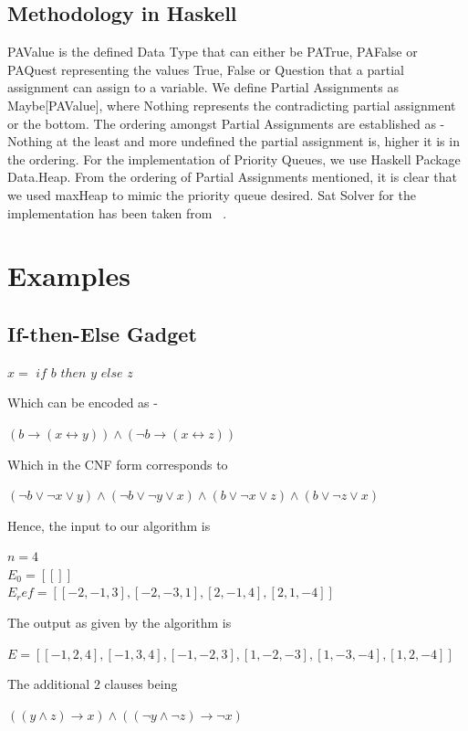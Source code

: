 \documentclass{article}
\theoremstyle{plain}
\begin{document}
\subsection{Methodology in Haskell}
PAValue is the defined Data Type that can either be PATrue, PAFalse or PAQuest representing the values True, False or Question that a partial assignment can assign to a variable. We define Partial Assignments as Maybe[PAValue], where Nothing represents the contradicting partial assignment or the bottom. The ordering amongst Partial Assignments are established as - Nothing at the least and more undefined the partial assignment is, higher it is in the ordering. For the implementation of Priority Queues, we use Haskell Package Data.Heap. From the ordering of Partial Assignments mentioned, it is clear that we used maxHeap to mimic the priority queue desired. Sat Solver for the implementation has been taken from ~\cite{sat.hs}.

\section{Examples}
\subsection{If-then-Else Gadget}
\begin{center}
$x = $ $if$ $b$ $then$ $y$ $else$ $z$
\end{center}
Which can be encoded as -
\begin{center}
$ (b \longrightarrow (x \longleftrightarrow y))  \wedge (\neg b \longrightarrow (x \longleftrightarrow z))$  
\end{center}
Which in the CNF form corresponds to
\begin{center}
$(\neg b \vee \neg x \vee y) \wedge (\neg b \vee \neg y \vee x) \wedge (b \vee \neg x \vee z) \wedge (b \vee \neg z \vee x)$
\end{center}
Hence, the input to our algorithm is
\begin{center}
$n = 4$\\
$E_0 = [[]]$ \\
$E_ref = [[-2,-1,3],[-2,-3,1],[2,-1,4],[2,1,-4]]$
\end{center}
The output as given by the algorithm is 
\begin{center}
$E = [[-1,2,4],[-1,3,4],[-1,-2,3],[1,-2,-3],[1,-3,-4],[1,2,-4]]$
\end{center}
The additional $2$ clauses being 
\begin{center}
$((y \wedge z) \longrightarrow x) \wedge ((\neg y \wedge \neg z) \longrightarrow \neg x)$
\end{center}
\end{document}
